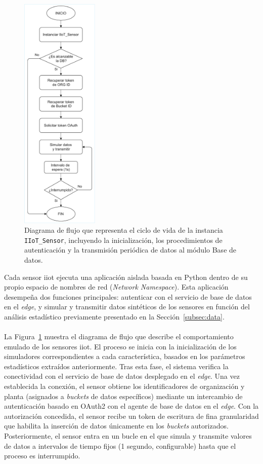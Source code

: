 \begin{figure}[ht!]
    \centering
    \includegraphics[width=0.33\textwidth]{fig/08_datadriven/datadriven_06.drawio.pdf}
    \caption{Diagrama de flujo que representa el ciclo de vida de la instancia \texttt{IIoT\_Sensor}, incluyendo la inicialización, los procedimientos de autenticación y la transmisión periódica de datos al módulo Base de datos.}
    \label{fig:iiot_sensor_flow}
\end{figure}

Cada sensor \gls{iiot} ejecuta una aplicación aislada basada en Python dentro de su propio espacio de nombres de red (\textit{Network Namespace}). Esta aplicación desempeña dos funciones principales: autenticar con el servicio de base de datos en el \textit{edge}, y simular y transmitir datos sintéticos de los sensores en función del análisis estadístico previamente presentado en la Sección~\ref{subsec:data}.\\
\\
La Figura~\ref{fig:iiot_sensor_flow} muestra el diagrama de flujo que describe el comportamiento emulado de los sensores \gls{iiot}. El proceso se inicia con la inicialización de los simuladores correspondientes a cada característica, basados en los parámetros estadísticos extraídos anteriormente. Tras esta fase, el sistema verifica la conectividad con el servicio de base de datos desplegado en el \textit{edge}. Una vez establecida la conexión, el sensor obtiene los identificadores de organización y planta (asignados a \textit{buckets} de datos específicos) mediante un intercambio de autenticación basado en OAuth2 con el agente de base de datos en el \textit{edge}. Con la autorización concedida, el sensor recibe un token de escritura de fina granularidad que habilita la inserción de datos únicamente en los \textit{buckets} autorizados. Posteriormente, el sensor entra en un bucle en el que simula y transmite valores de datos a intervalos de tiempo fijos (1 segundo, configurable) hasta que el proceso es interrumpido.



